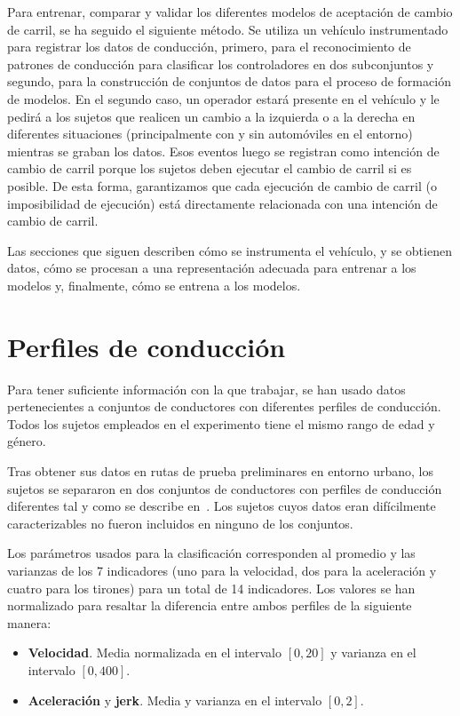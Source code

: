Para entrenar, comparar y validar los diferentes modelos de aceptación de cambio de carril, se ha seguido el siguiente método. Se utiliza un vehículo instrumentado para registrar los datos de conducción, primero, para el reconocimiento de patrones de conducción para clasificar los controladores en dos subconjuntos y segundo, para la construcción de conjuntos de datos para el proceso de formación de modelos. En el segundo caso, un operador estará presente en el vehículo y le pedirá a los sujetos que realicen un cambio a la izquierda o a la derecha en diferentes situaciones (principalmente con y sin automóviles en el entorno) mientras se graban los datos. Esos eventos luego se registran como intención de cambio de carril porque los sujetos deben ejecutar el cambio de carril si es posible. De esta forma, garantizamos que cada ejecución de cambio de carril (o imposibilidad de ejecución) está directamente relacionada con una intención de cambio de carril.

Las secciones que siguen describen cómo se instrumenta el vehículo, y se obtienen datos, cómo se procesan a una representación adecuada para entrenar a los modelos y, finalmente, cómo se entrena a los modelos.


\section{Perfiles de conducción}

Para tener suficiente información con la que trabajar, se han usado datos pertenecientes a conjuntos de conductores con diferentes perfiles de conducción. Todos los sujetos empleados en el experimento tiene el mismo rango de edad y género.

Tras obtener sus datos en rutas de prueba preliminares en entorno urbano, los sujetos se separaron en dos conjuntos de conductores con perfiles de conducción diferentes tal y como se describe en~\cite{DiazAlvarez2014}. Los sujetos cuyos datos eran difícilmente caracterizables no fueron incluidos en ninguno de los conjuntos.

Los parámetros usados para la clasificación corresponden al promedio y las varianzas de los 7 indicadores (uno para la velocidad, dos para la aceleración y cuatro para los tirones) para un total de 14 indicadores. Los valores se han normalizado para resaltar la diferencia entre ambos perfiles de la siguiente manera:

\begin{itemize}
	\item \textbf{Velocidad}. Media normalizada en el intervalo $[0, 20]$ y varianza en el intervalo $[0, 400]$.
	\item \textbf{Aceleración} y \textbf{jerk}. Media y varianza en el intervalo $[0, 2]$.
\end{itemize}

